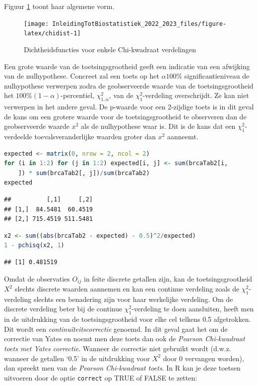 \documentclass[
  12pt,dutch,coursenotes]{book}
\begin{document}
Figuur \ref{fig:chidist} toont haar algemene vorm.

\begin{figure}

{\centering \texttt{[image: InleidingTotBiostatistiek\_2022\_2023\_files/figure-latex/chidist-1]} 

}

\caption{Dichtheidsfuncties voor enkele Chi-kwadraat verdelingen}\label{fig:chidist}
\end{figure}

Een grote waarde van de toetsingsgrootheid geeft een indicatie van een
afwijking van de nulhypothese. Concreet zal een toets op het \(\alpha 100\%\)
significantieniveau de nulhypothese verwerpen zodra de geobserveerde waarde
van de toetsingsgrootheid het \(100\%(1-\alpha)\)-percentiel, \(\chi^2_{1, \alpha}\), van de \(\chi^2_1\)-verdeling overschrijdt. Ze kan niet verwerpen in
het andere geval. De p-waarde voor een 2-zijdige toets is in dit geval de
kans om een grotere waarde voor de toetsingsgrootheid te observeren dan de
geobserveerde waarde \(x^2\) als de nulhypothese waar is. Dit is de kans dat
een \(\chi^2_1\)-verdeelde toevalsveranderlijke waarden groter dan \(x^2\)
aanneemt.

\begin{lstlisting}[language=R]
expected <- matrix(0, nrow = 2, ncol = 2)
for (i in 1:2) for (j in 1:2) expected[i, j] <- sum(brcaTab2[i,
    ]) * sum(brcaTab2[, j])/sum(brcaTab2)
expected
\end{lstlisting}

\begin{lstlisting}
##          [,1]     [,2]
## [1,]  84.5481  60.4519
## [2,] 715.4519 511.5481
\end{lstlisting}

\begin{lstlisting}[language=R]
x2 <- sum((abs(brcaTab2 - expected) - 0.5)^2/expected)
1 - pchisq(x2, 1)
\end{lstlisting}

\begin{lstlisting}
## [1] 0.481519
\end{lstlisting}

Omdat de observaties \(O_{ij}\) in feite discrete getallen zijn, kan de
toetsingsgrootheid \(X^2\) slechts discrete waarden aannemen en kan een
continue verdeling zoals de \(\chi^2_1\)-verdeling slechts een benadering zijn
voor haar werkelijke verdeling. Om de discrete verdeling beter bij de
continue \(\chi^2_1\)-verdeling te doen aansluiten, heeft men in de
uitdrukking van de toetsingsgrootheid voor elke cel telkens 0.5 afgetrokken. Dit wordt een
\emph{continuïteitscorrectie} genoemd. In dit geval gaat het om de
correctie van Yates en noemt men deze toets dan ook de \emph{Pearson
Chi-kwadraat toets met Yates correctie}. Wanneer de correctie niet gebruikt
wordt (d.w.z. wanneer de getallen `0.5' in de uitdrukking voor \(X^2\) door 0
vervangen worden), dan spreekt men van de \emph{Pearson Chi-kwadraat toets}.
In R kan je deze toetsen uitvoeren door de optie \texttt{correct} op TRUE of FALSE te zetten:
\end{document}

